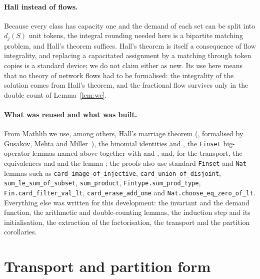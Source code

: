 \documentclass[11pt]{article}
\theoremstyle{definition}
\theoremstyle{remark}
\newcommand{\lean}[1]{\texttt{#1}}
\begin{document}
\paragraph{Hall instead of flows.} Because every class has capacity one and the demand of each set
can be split into $d_j(S)$ unit tokens, the integral rounding needed here is a bipartite matching
problem, and Hall's theorem suffices. Hall's theorem is itself a consequence of flow integrality,
and replacing a capacitated assignment by a matching through token copies is a standard device; we
do not claim either as new. Its use here means that no theory of network flows had to be
formalised: the integrality of the solution comes from Hall's theorem, and the fractional flow
survives only in the double count of Lemma~\ref{lem:wc}.

\paragraph{What was reused and what was built.} From Mathlib we use, among others, Hall's marriage theorem
(, formalised by Gusakov, Mehta and
Miller~\cite{HallLean}), the binomial identities  and
, the \lean{Finset} big-operator lemmas named above together with
 and , and, for the transport, the
equivalences  and  and the lemma
; the proofs also use standard \lean{Finset} and \lean{Nat} lemmas such as
\lean{card\_image\_of\_injective}, \lean{card\_union\_of\_disjoint}, \lean{sum\_le\_sum\_of\_subset},
\lean{sum\_product}, \lean{Fintype.sum\_prod\_type}, \lean{Fin.card\_filter\_val\_lt},
\lean{card\_erase\_add\_one} and \lean{Nat.choose\_eq\_zero\_of\_lt}. Everything else was written for this development: the invariant and the
demand function, the arithmetic and double-counting lemmas, the induction step and its
initialisation, the extraction of the factorisation, the transport and the partition corollaries.

\section{Transport and partition form}\label{sec:new}
\end{document}
